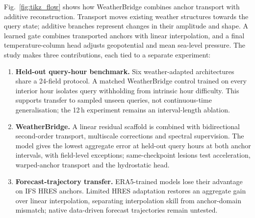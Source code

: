 \documentclass[referee,lineno,pdflatex,sn-nature]{sn-jnl}
\begin{document}
Fig.~\ref{fig:tikz_flow} shows how WeatherBridge combines anchor transport
with additive reconstruction. Transport moves existing weather structures
towards the query state; additive branches represent changes in their
amplitude and shape. A learned gate combines transported anchors with
linear interpolation, and a final temperature-column head adjusts
geopotential and mean sea-level pressure.
The study makes three contributions, each tied to a separate experiment:
\begin{enumerate}
\item \textbf{Held-out query-hour benchmark.} Six weather-adapted architectures share a
24-field protocol. A matched WeatherBridge control trained on every interior
hour isolates query withholding from intrinsic hour difficulty. This supports
transfer to sampled unseen queries, not continuous-time generalisation; the
12\,h experiment remains an interval-length ablation.

\item \textbf{WeatherBridge.} A linear residual scaffold is combined with
bidirectional second-order transport, multiscale corrections and spectral
supervision. The model gives the lowest aggregate error at held-out query hours at both
anchor intervals, with field-level exceptions; same-checkpoint lesions test
acceleration, warped-anchor transport and the hydrostatic head.

\item \textbf{Forecast-trajectory transfer.} ERA5-trained models lose their
advantage on IFS HRES anchors. Limited HRES adaptation restores an aggregate
gain over linear interpolation, separating interpolation skill from
anchor-domain mismatch; native data-driven forecast trajectories remain
untested.
\end{enumerate}
\FloatBarrier
\end{document}
